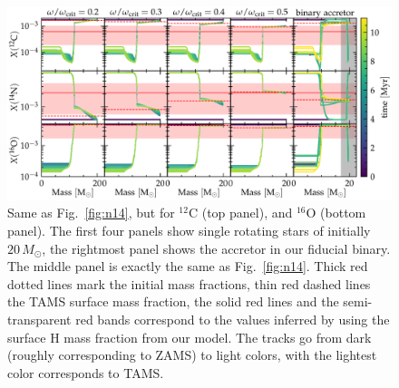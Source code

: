 \documentclass[twocolumn,twocolappendix,trackchanges]{aastex63}
\DeclareRobustCommand{\Figref}[1]{Fig.~\ref{#1}}
\begin{document}
\begin{figure}[htbp]
  \centering
  \includegraphics[width=\textwidth]{huge_composition}
  \caption{Same as \Figref{fig:n14}, but for $^{12}\mathrm{C}$ (top
    panel), and $^{16}\mathrm{O}$ (bottom panel). The first four
    panels show single rotating stars of initially $20\,M_\odot$, the
    rightmost panel shows the accretor in our fiducial binary. The middle panel is
    exactly the same as \Figref{fig:n14}. Thick red dotted lines mark the
    initial mass fractions, thin red dashed lines the TAMS surface mass
    fraction, the solid red lines and the semi-transparent red bands
    correspond to the values inferred by 
    using the surface H mass fraction from our model. The tracks go
    from dark (roughly corresponding to ZAMS) to light colors, with the
    lightest color corresponds to TAMS.}
  \label{fig:composition_huge}
\end{figure}
\end{document}
